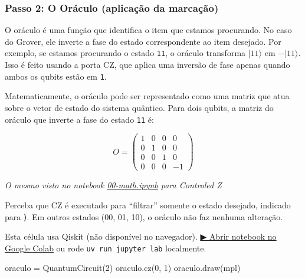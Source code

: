 \documentclass[
  brazilian,
]{report}
\newenvironment{Shaded}{\begin{snugshade}}{\end{snugshade}}
\newcommand{\DecValTok}[1]{\textcolor[rgb]{0.68,0.00,0.00}{#1}}
\newcommand{\NormalTok}[1]{\textcolor[rgb]{0.00,0.23,0.31}{#1}}
\newcommand{\OperatorTok}[1]{\textcolor[rgb]{0.37,0.37,0.37}{#1}}
\newcommand{\StringTok}[1]{\textcolor[rgb]{0.13,0.47,0.30}{#1}}
\begin{document}
\subsubsection{Passo 2: O Oráculo (aplicação da
marcação)}\label{passo-2-o-oruxe1culo-aplicauxe7uxe3o-da-marcauxe7uxe3o}

O oráculo é uma função que identifica o item que estamos procurando. No
caso do Grover, ele inverte a fase do estado correspondente ao item
desejado. Por exemplo, se estamos procurando o estado \texttt{11}, o
oráculo transforma \(|11\rangle\) em \(-|11\rangle\). Isso é feito
usando a porta CZ, que aplica uma inversão de fase apenas quando ambos
os qubits estão em \texttt{1}.

Matematicamente, o oráculo pode ser representado como uma matriz que
atua sobre o vetor de estado do sistema quântico. Para dois qubits, a
matriz do oráculo que inverte a fase do estado \texttt{11} é:

\[
O = \begin{pmatrix}
1 & 0 & 0 & 0 \\
0 & 1 & 0 & 0 \\
0 & 0 & 1 & 0 \\
0 & 0 & 0 & -1
\end{pmatrix}
\]

\emph{O mesmo visto no notebook \href{./00-math.ipynb}{00-math.ipynb}
para Controled Z}

Perceba que CZ é executado para ``filtrar'' somente o estado desejado,
indicado para ⟩. Em outros estados (00, 01, 10), o oráculo não
faz nenhuma alteração.

\begin{tcolorbox}[enhanced jigsaw, arc=.35mm, bottomrule=.15mm, bottomtitle=1mm, breakable, colback=white, colbacktitle=quarto-callout-warning-color!10!white, colframe=quarto-callout-warning-color-frame, coltitle=black, left=2mm, leftrule=.75mm, opacityback=0, opacitybacktitle=0.6, rightrule=.15mm, title=\textcolor{quarto-callout-warning-color}{\faExclamationTriangle}\hspace{0.5em}{⚛️ Célula Qiskit --- execute no Colab ou localmente}, titlerule=0mm, toprule=.15mm, toptitle=1mm]

Esta célula usa Qiskit (não disponível no navegador).
\href{https://colab.research.google.com/github/maxwellamaral/aula-quantum/blob/main/notebooks/06-grover.ipynb}{▶
Abrir notebook no Google Colab} ou rode \texttt{uv\ run\ jupyter\ lab}
localmente.

\begin{Shaded}
\begin{Highlighting}[]

\NormalTok{oraculo }\OperatorTok{=}\NormalTok{ QuantumCircuit(}\DecValTok{2}\NormalTok{)}
\NormalTok{oraculo.cz(}\DecValTok{0}\NormalTok{, }\DecValTok{1}\NormalTok{)}
\NormalTok{oraculo.draw(}\StringTok{\textquotesingle{}mpl\textquotesingle{}}\NormalTok{)}
\end{Highlighting}
\end{Shaded}

\end{tcolorbox}
\end{document}
